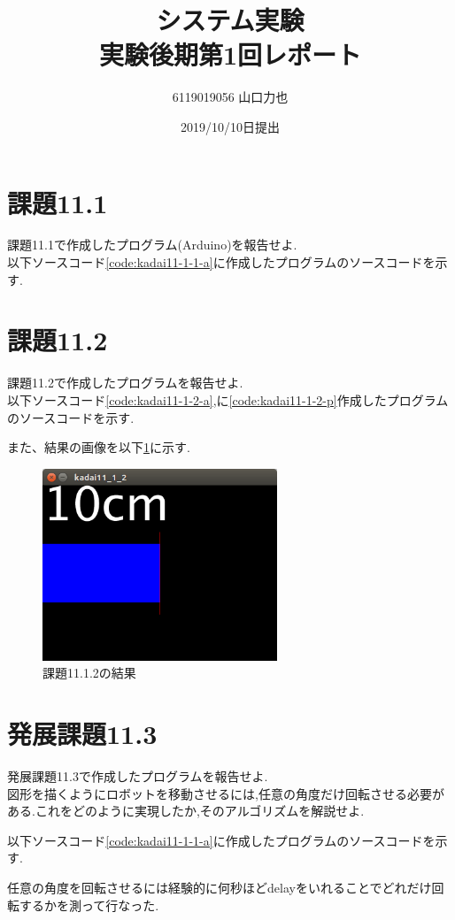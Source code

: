\documentclass{jarticle}
\title{{システム実験}\\実験後期第1回レポート}
\author{6119019056 山口力也}
\date{2019/10/10日提出}
\begin{document}
\maketitle
\section{課題11.1}
課題11.1で作成したプログラム(Arduino)を報告せよ. \\
以下ソースコード\ref{code:kadai11-1-1-a}に作成したプログラムのソースコードを示す.



\section{課題11.2}
課題11.2で作成したプログラムを報告せよ. \\
以下ソースコード\ref{code:kadai11-1-2-a},に\ref{code:kadai11-1-2-p}作成したプログラムのソースコードを示す.




また、結果の画像を以下\ref{fig:kadai11-1-2}に示す.
\begin{figure}[H]
\begin{center}
\includegraphics[width=7.0cm]{figures/kadai11-1-2.png}
\caption{課題11.1.2の結果}
\label{fig:kadai11-1-2}
\end{center}
\end{figure}

\section{発展課題11.3}
発展課題11.3で作成したプログラムを報告せよ. \\
図形を描くようにロボットを移動させるには,任意の角度だけ回転させる必要がある.これをどのように実現したか,そのアルゴリズムを解説せよ.

以下ソースコード\ref{code:kadai11-1-1-a}に作成したプログラムのソースコードを示す.



任意の角度を回転させるには経験的に何秒ほどdelayをいれることでどれだけ回転するかを測って行なった.
\end{document}
